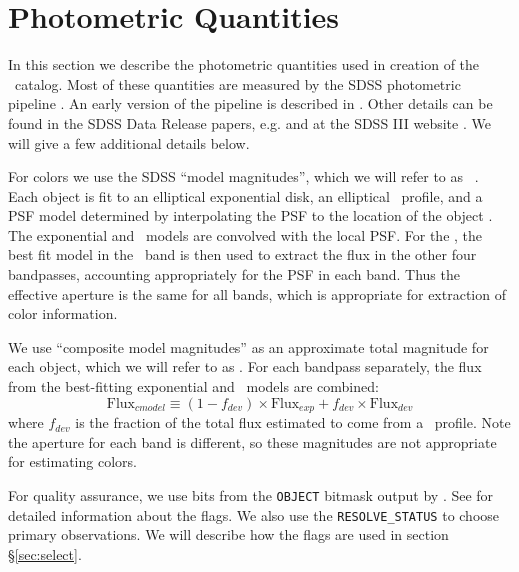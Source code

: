 \documentclass[preprint]{aastex}
\begin{document}
\section{Photometric Quantities} \label{sec:photo}

In this section we describe the photometric quantities used in creation of the
\photoz\ catalog.  Most of these quantities are measured by the SDSS
photometric pipeline \photo. An early version of the pipeline is described in
\citet{LuptonADASS01}.  Other details can be found in the SDSS Data Release
papers, e.g. \citet{dr4} and at the SDSS III website \citep{sdssorg}.  We will
give a few additional details below.

For colors we use the SDSS ``model magnitudes'', which we will refer to as
\modelmag\ \citep{dr7photo}.  Each object is fit to an elliptical exponential
disk, an elliptical \devauc\ profile, and a PSF model determined by
interpolating the PSF to the location of the
object \citep{LuptonADASS01,Sheldon04}.  The exponential and \devauc\ models are
convolved with the local PSF.  For the \modelmag, the best fit model in the
\rmag\ band is then used to extract the flux in the other four bandpasses,
accounting appropriately for the PSF in each band. Thus the effective aperture
is the same for all bands, which is appropriate for extraction of color
information.

We use ``composite model magnitudes'' as an approximate total magnitude for
each object, which we will refer to as \cmodelmag.  For each bandpass
separately, the flux from the best-fitting exponential and \devauc\ models are
combined:
\begin{equation}
\textrm{Flux}_{cmodel} \equiv (1-f_{dev})\times \textrm{Flux}_{exp} + f_{dev} \times \textrm{Flux}_{dev}
\end{equation}
where $f_{dev}$ is the fraction of the total flux estimated to come from a
\devauc\ profile\citep{dr7photo}.  Note the aperture for each band is
different, so these magnitudes are not appropriate for estimating colors.

For quality assurance, we use bits from the \texttt{OBJECT} bitmask output by
\photo.  See \citet{dr7flags} for detailed information about the flags.    We
also use the \texttt{RESOLVE\_STATUS} \citep{dr7resolve} to choose primary
observations.  We will describe how the flags are used in section \S \ref{sec:select}.

    
\end{document}
